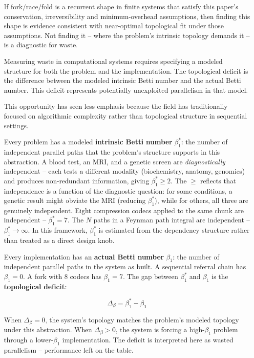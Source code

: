 \documentclass[
  11pt,
]{article}
\begin{document}
If fork/race/fold is a recurrent shape in finite systems that satisfy
this paper's conservation, irreversibility and minimum-overhead
assumptions, then finding this shape is evidence consistent with
near-optimal topological fit under those assumptions. Not finding it --
where the problem's intrinsic topology demands it -- is a diagnostic for
waste.

Measuring waste in computational systems requires specifying a modeled
structure for both the problem and the implementation. The topological
deficit is the difference between the modeled intrinsic Betti number and
the actual Betti number. This deficit represents potentially unexploited
parallelism in that model.

This opportunity has seen less emphasis because the field has
traditionally focused on algorithmic complexity rather than topological
structure in sequential settings.

Every problem has a modeled \textbf{intrinsic Betti number}
\(\beta_1^*\): the number of independent parallel paths that the
problem's structure supports in this abstraction. A blood test, an MRI,
and a genetic screen are \emph{diagnostically} independent -- each tests
a different modality (biochemistry, anatomy, genomics) and produces
non-redundant information, giving \(\beta_1^* \geq 2\). The \(\geq\)
reflects that independence is a function of the diagnostic question: for
some conditions, a genetic result might obviate the MRI (reducing
\(\beta_1^*\)), while for others, all three are genuinely independent.
Eight compression codecs applied to the same chunk are independent --
\(\beta_1^* = 7\). The \(N\) paths in a Feynman path integral are
independent -- \(\beta_1^* \to \infty\). In this framework,
\(\beta_1^*\) is estimated from the dependency structure rather than
treated as a direct design knob.

Every implementation has an \textbf{actual Betti number} \(\beta_1\):
the number of independent parallel paths in the system as built. A
sequential referral chain has \(\beta_1 = 0\). A fork with 8 codecs has
\(\beta_1 = 7\). The gap between \(\beta_1^*\) and \(\beta_1\) is the
\textbf{topological deficit}:

\[
\Delta_\beta = \beta_1^* - \beta_1
\]

When \(\Delta_\beta = 0\), the system's topology matches the problem's
modeled topology under this abstraction. When \(\Delta_\beta > 0\), the
system is forcing a high-\(\beta_1\) problem through a lower-\(\beta_1\)
implementation. The deficit is interpreted here as wasted parallelism --
performance left on the table.
\end{document}
